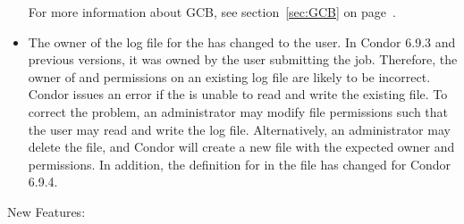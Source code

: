 \begin{itemize}
  For more information about GCB, see section~\ref{sec:GCB} on
  page~\pageref{sec:GCB}. 

\item The owner of the log file for the 
  has changed to the  user.
  In Condor 6.9.3 and previous versions, it was owned by the
  user submitting the job.
  Therefore, the owner of and permissions on an existing log file 
  are likely to be incorrect.
  Condor issues an error if the  is unable
  to read and write the existing file.
  To correct the problem, an administrator may modify file 
  permissions such that the  user may read and
  write the log file. 
  Alternatively, an administrator may delete the file, and
  Condor will create a new file with the expected owner and
  permissions.
  In addition, the definition for 
  in the  file has changed for
  Condor 6.9.4.

\end{itemize}


\noindent New Features:

